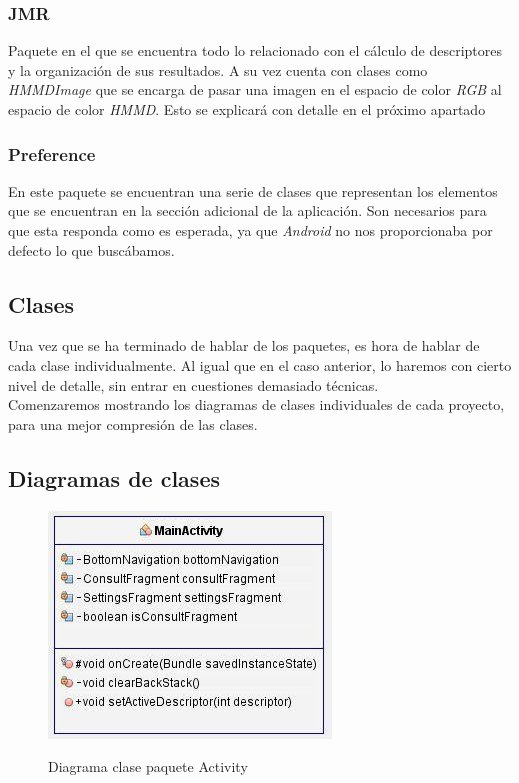 \subsubsection{JMR}

Paquete en el que se encuentra todo lo relacionado con el cálculo de descriptores y la organización de sus resultados. A su vez cuenta con clases como \textit{HMMDImage} que se encarga de pasar una imagen en el espacio de color \textit{RGB} al espacio de color \textit{HMMD}. Esto se explicará con detalle en el próximo apartado

\subsubsection{Preference}

En este paquete se encuentran una serie de clases que representan los elementos que se encuentran en la sección adicional de la aplicación. Son necesarios para que esta responda como es esperada, ya que \textit{Android} no nos proporcionaba por defecto lo que buscábamos.

\subsection{Clases}

Una vez que se ha terminado de hablar de los paquetes, es hora de hablar de cada clase individualmente. Al igual que en el caso anterior, lo haremos con cierto nivel de detalle, sin entrar en cuestiones demasiado técnicas.\\

Comenzaremos mostrando los diagramas de clases individuales de cada proyecto, para una mejor compresión de las clases.\\

\subsection{Diagramas de clases}

\begin{figure}[H] %
\centering
\includegraphics[scale=0.6]{imagenes/diagrama1.jpg}  %
\label{diagrama1}
\caption{Diagrama clase paquete Activity}
\end{figure}

